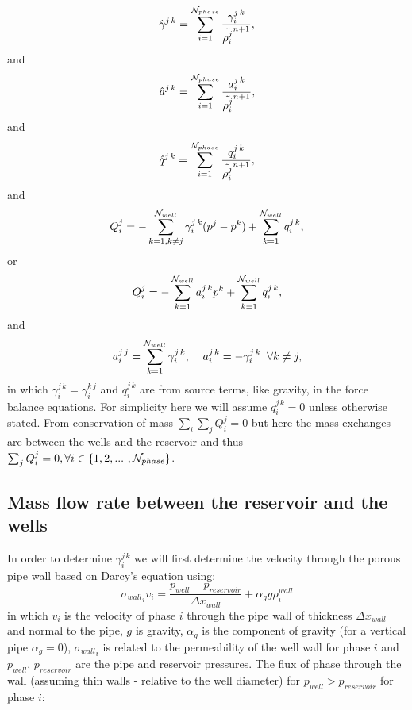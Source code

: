 \begin{equation}
\hat\gamma^{j\,k}=\sum_{i=1}^{ {\cal N}_{phase} }  \frac{ \gamma^{j\,k}_i }{ \tilde{\rho_i^j}^{n+1} },
\label{saturation_wells_6}
\end{equation}
and
\begin{equation}
\hat a^{j\,k}=\sum_{i=1}^{ {\cal N}_{phase} }  \frac{ a^{j\,k}_i }{ \tilde{\rho_i^j}^{n+1} },
\label{saturation_wells_6-a}
\end{equation}
and
\begin{equation}
\hat q^{j\,k}=\sum_{i=1}^{ {\cal N}_{phase} }  \frac{ q^{j\,k}_i }{ \tilde{\rho_i^j}^{n+1} },
\label{saturation_wells_6b}
\end{equation}
and
\begin{equation}
Q_i^{j} = 
-\sum_{k=1, k\neq j}^{{\cal N}_{well}}\gamma^{j\,k}_i  (p^j - p^k)   
+ \sum_{k=1}^{{\cal N}_{well}} q^{j\,k}_i, 
\label{saturation_wells_7}
\end{equation}
or 
\begin{equation}
Q_i^{j} = 
-\sum_{k=1}^{{\cal N}_{well}} a^{j\,k}_i  p^k 
+ \sum_{k=1}^{{\cal N}_{well}} q^{j\,k}_i, 
\label{saturation_wells_7-a}
\end{equation}
and 
\begin{equation}
a^{j\,j}_i= \sum_{k=1}^{ {\cal N}_{well} }  \gamma^{j\,k}_i , \;\;\;\;
a^{j\,k}_i=  -  \gamma^{j\,k}_i \;\; \forall k\neq j , 
\label{saturation_wells_8-a}
\end{equation}
in which $\gamma^{j\,k}_i=\gamma^{k\,j}_i$ and $q^{j\,k}_i$ are from source terms, like gravity, in the 
force balance equations. For simplicity here we will assume $q^{j\,k}_i=0$ unless otherwise stated. 
From conservation of mass $\sum_i\sum_j Q^j_i=0$ but here the mass exchanges are between the wells and 
the reservoir and thus $\sum_j Q^j_i=0, \forall i \in\{ 1,2,...~ , {\cal N}_{phase}\}$. 




\subsection{Mass flow rate between the reservoir and the wells} 
\label{Mass flow rate between the reservoir and the wells} 
In order to determine $\gamma^{j\,k}_i$ we will first determine the 
velocity through the porous pipe wall based on Darcy's equation using:
\begin{equation}
{\sigma_{wall}}_i v_i = \frac{ p_{well} - p_{reservoir} }{{\Delta x}_{wall}} +\alpha_g g \rho_i^{wall}
\label{saturation_wells_8}
\end{equation}
in which $v_i$ is the velocity of phase $i$ through the pipe wall of thickness ${\Delta x}_{wall}$ and normal to the pipe, 
$g$ is gravity, $\alpha_g$ is the component of gravity (for a vertical pipe $\alpha_g=0$),  
${\sigma_{wall}}_i$ is related to the permeability of the well wall for phase $i$ 
and 
$p_{well}$,  $p_{reservoir}$ are the pipe and reservoir pressures. 
The flux of phase through the wall (assuming thin walls - relative to the well diameter) 
for $p_{well}>p_{reservoir}$ for phase $i$: 


